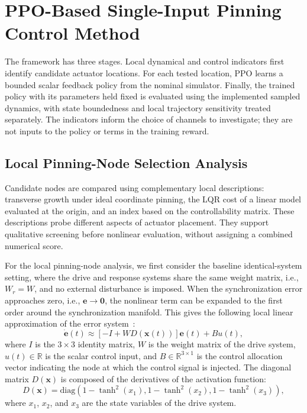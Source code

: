 \documentclass[a4paper,fleqn]{cas-dc}
\theoremstyle{plain}
\theoremstyle{definition}
\begin{document}
\section{PPO-Based Single-Input Pinning Control Method}
\label{sec:ppo_pinning_method}

The framework has three stages. Local dynamical and control indicators first identify candidate actuator locations. For each tested location, PPO learns a bounded scalar feedback policy from the nominal simulator. Finally, the trained policy with its parameters held fixed is evaluated using the implemented sampled dynamics, with state boundedness and local trajectory sensitivity treated separately. The indicators inform the choice of channels to investigate; they are not inputs to the policy or terms in the training reward.

\subsection{Local Pinning-Node Selection Analysis}
\label{subsec:local_node_selection}

Candidate nodes are compared using complementary local descriptions: transverse growth under ideal coordinate pinning, the LQR cost of a linear model evaluated at the origin, and an index based on the controllability matrix. These descriptions probe different aspects of actuator placement. They support qualitative screening before nonlinear evaluation, without assigning a combined numerical score.

For the local pinning-node analysis, we first consider the baseline identical-system setting, where the drive and response systems share the same weight matrix, i.e., $W_r=W$, and no external disturbance is imposed. When the synchronization error approaches zero, i.e., $\mathbf{e}\to \mathbf{0}$, the nonlinear term can be expanded to the first order around the synchronization manifold. This gives the following local linear approximation of the error system~\cite{slotine1991applied}:
\begin{equation}
	\dot{\mathbf{e}}(t)
	\approx
	\left[-I+WD(\mathbf{x}(t))\right]\mathbf{e}(t)
	+
	Bu(t),
	\label{eq:local_linear_error}
\end{equation}
where $I$ is the $3\times 3$ identity matrix, $W$ is the weight matrix of the drive system, $u(t)\in\mathbb{R}$ is the scalar control input, and $B\in\mathbb{R}^{3\times 1}$ is the control allocation vector indicating the node at which the control signal is injected. The diagonal matrix $D(\mathbf{x})$ is composed of the derivatives of the activation function:
\begin{equation}
	D(\mathbf{x})
	=
	\mathrm{diag}
	\left(
	1-\tanh^2(x_1),
	1-\tanh^2(x_2),
	1-\tanh^2(x_3)
	\right),
	\label{eq:D_matrix}
\end{equation}
where $x_1$, $x_2$, and $x_3$ are the state variables of the drive system.
\end{document}
